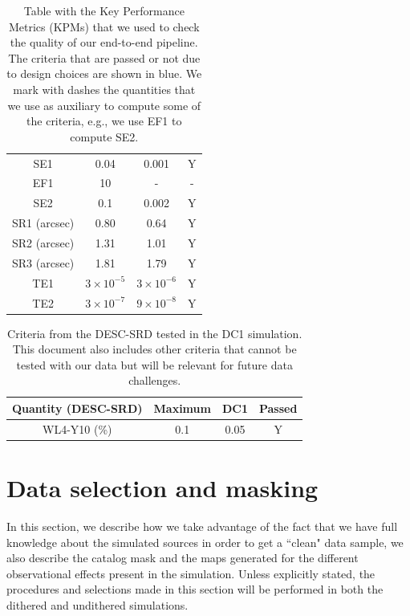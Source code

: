 \documentclass[twocolumn]{aastex62}
\newcommand{\rachel}[1]{{\textcolor{cyan}{{\textbf (RM: #1)}}}}
\begin{document}
\begin{table}[h!]
\begin{tabular}{|c|c|c|c|}
SE1 & 0.04 & 0.001 & Y\\
EF1 & 10 & - & -\\
SE2 & 0.1 & 0.002 & Y\\
SR1 (arcsec) & 0.80 & 0.64 & Y\\
SR2 (arcsec) & 1.31 & 1.01 & Y\\
SR3 (arcsec) & 1.81 & 1.79 & Y\\
TE1 & $3 \times 10^{-5}$ & $3\times 10^{-6}$ & Y\\
TE2 & $3 \times 10^{-7}$ & $9\times 10^{-8}$ & Y\\
\hline
\end{tabular}
\caption{Table with the Key Performance Metrics (KPMs) that we used to check the quality of our end-to-end pipeline. The criteria that are passed or not due to design choices are shown in blue. We mark with dashes the quantities that we use as auxiliary to compute some of the criteria, e.g., we use EF1 to compute SE2.}
\label{tab:kpm_table}
\end{table}

\begin{table}[h!]
\centering
\begin{tabular}{|c|c|c|c|}
\hline
Quantity (DESC-SRD) & Maximum & DC1 & Passed \\
\hline
WL4-Y10 (\%) & 0.1 & 0.05 & Y\\
\hline
\end{tabular}
\caption{Criteria from the DESC-SRD tested in the DC1 simulation. This document also includes other criteria that cannot be tested with our data but will be relevant for future data challenges.}
\label{tab:desc_srd_table}
\end{table}


\section{Data selection and masking}
\label{sec:data_selection}
In this section, we describe how we take advantage of the fact that we have full knowledge about the simulated sources in order to get a ``clean" data sample, we also describe the catalog mask and the maps generated for the different observational effects present in the simulation. Unless explicitly stated, the procedures and selections made in this section will be performed in both the dithered and undithered simulations.
\end{document}
